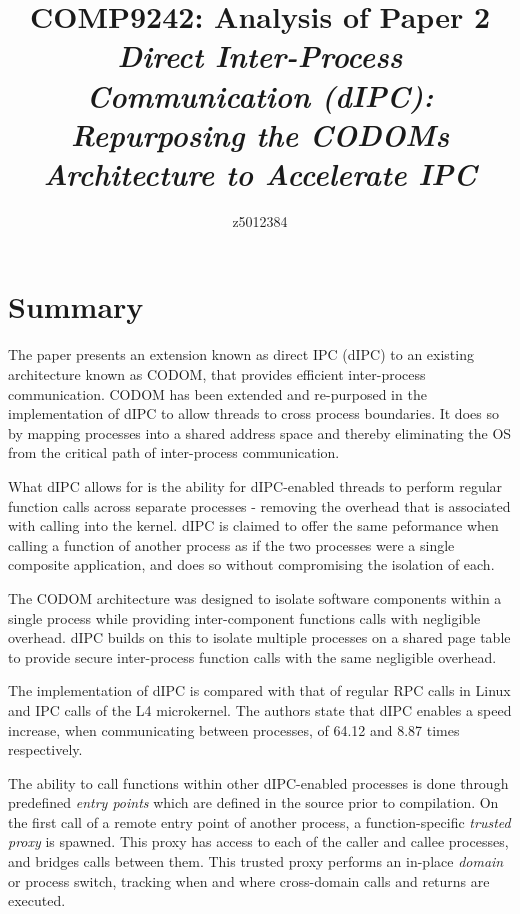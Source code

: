 \documentclass{article}
\begin{document}
\title{COMP9242: Analysis of Paper 2 \\ \vspace{0.75cm} \large \textit{Direct Inter-Process Communication (dIPC): Repurposing the CODOMs Architecture to Accelerate IPC}}

\author{z5012384}

\maketitle

\section*{Summary}
The paper presents an extension known as direct IPC (dIPC) to an existing architecture known as CODOM, that provides efficient inter-process communication. CODOM has been extended and re-purposed in the implementation of dIPC to allow threads to cross process boundaries. It does so by mapping processes into a shared address space and thereby eliminating the OS from the critical path of inter-process communication.

What dIPC allows for is the ability for dIPC-enabled threads to perform regular function calls across separate processes - removing the overhead that is associated with calling into the kernel. dIPC is claimed to offer the same peformance when calling a function of another process as if the two processes were a single composite application, and does so without compromising the isolation of each.

The CODOM architecture was designed to isolate software components within a single process while providing inter-component functions calls  with negligible overhead. dIPC builds on this to isolate multiple processes on a shared page table to provide secure inter-process function calls with the same negligible overhead.

The implementation of dIPC is compared with that of regular RPC calls in Linux and IPC calls of the L4 microkernel. The authors state that dIPC enables a speed increase, when communicating between processes, of 64.12 and 8.87 times respectively. 

The ability to call functions within other dIPC-enabled processes is done through predefined \textit{entry points} which are defined in the source prior to compilation. On the first call of a remote entry point of another process, a function-specific \textit{trusted proxy} is spawned. This proxy has access to each of the caller and callee processes, and bridges calls between them. This trusted proxy performs an in-place \textit{domain} or process switch, tracking  when and where cross-domain calls and returns are executed.
\end{document}
